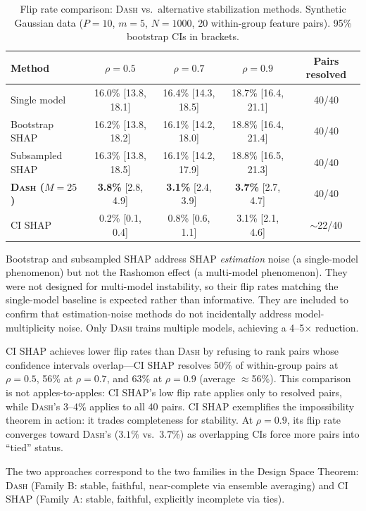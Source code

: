 \documentclass{article}
\newcommand{\DASH}{\textsc{Dash}}
\begin{document}
\begin{table}[t]
\centering
\caption{Flip rate comparison: \DASH{} vs.\ alternative stabilization methods. Synthetic Gaussian data ($P{=}10$, $m{=}5$, $N{=}1000$, 20 within-group feature pairs). 95\% bootstrap CIs in brackets.}
\label{tab:dash-benchmark}
\small
\begin{tabular}{@{}lcccc@{}}
\toprule
Method & $\rho = 0.5$ & $\rho = 0.7$ & $\rho = 0.9$ & Pairs resolved \\
\midrule
Single model       & 16.0\% [13.8, 18.1] & 16.4\% [14.3, 18.5] & 18.7\% [16.4, 21.1] & 40/40 \\
Bootstrap SHAP     & 16.2\% [13.8, 18.2] & 16.1\% [14.2, 18.0] & 18.8\% [16.4, 21.4] & 40/40 \\
Subsampled SHAP    & 16.3\% [13.8, 18.5] & 16.1\% [14.2, 17.9] & 18.8\% [16.5, 21.3]  & 40/40 \\
\textbf{\DASH{} ($M{=}25$)} & \textbf{3.8\%} [2.8, 4.9] & \textbf{3.1\%} [2.4, 3.9] & \textbf{3.7\%} [2.7, 4.7] & 40/40 \\
CI SHAP            & 0.2\% [0.1, 0.4]    & 0.8\% [0.6, 1.1]    & 3.1\% [2.1, 4.6]     & $\sim$22/40 \\
\bottomrule
\end{tabular}
\end{table}

Bootstrap and subsampled SHAP address SHAP \emph{estimation} noise (a single-model phenomenon) but not the Rashomon effect (a multi-model phenomenon). They were not designed for multi-model instability, so their flip rates matching the single-model baseline is expected rather than informative. They are included to confirm that estimation-noise methods do not incidentally address model-multiplicity noise. Only \DASH{} trains multiple models, achieving a 4--5$\times$ reduction.

CI SHAP achieves lower flip rates than \DASH{} by refusing to rank pairs whose confidence intervals overlap---CI SHAP resolves 50\% of within-group pairs at $\rho=0.5$, 56\% at $\rho=0.7$, and 63\% at $\rho=0.9$ (average $\approx$56\%). This comparison is not apples-to-apples: CI SHAP's low flip rate applies only to resolved pairs, while \DASH{}'s 3--4\% applies to all 40 pairs. CI SHAP exemplifies the impossibility theorem in action: it trades completeness for stability. At $\rho = 0.9$, its flip rate converges toward \DASH{}'s ($3.1\%$ vs.\ $3.7\%$) as overlapping CIs force more pairs into ``tied'' status.

The two approaches correspond to the two families in the Design Space Theorem: \DASH{} (Family B: stable, faithful, near-complete via ensemble averaging) and CI SHAP (Family A: stable, faithful, explicitly incomplete via ties).
\end{document}

